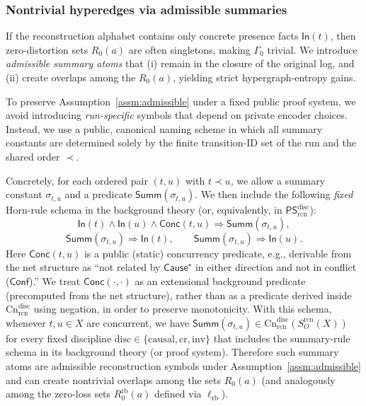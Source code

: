 \documentclass[twoside]{article}
\newcommand{\Cn}{\mathrm{Cn}}
\newcommand{\1}{\mathbf{1}}
\begin{document}
\subsubsection{Nontrivial hyperedges via admissible summaries}
\label{sec:rcn-nontrivial-gamma0}

If the reconstruction alphabet contains only concrete presence facts \(\mathsf{In}(t)\),
then zero-distortion sets \(R_0(a)\) are often singletons, making \(\Gamma_0\) trivial.
We introduce \emph{admissible summary atoms} that (i) remain in the closure of the original log,
and (ii) create overlaps among the \(R_0(a)\), yielding strict hypergraph-entropy gains.


To preserve Assumption~\ref{assm:admissible} under a fixed public proof system, we avoid introducing \emph{run-specific} symbols
that depend on private encoder choices.
Instead, we use a public, canonical naming scheme in which all summary constants are determined solely by the finite
transition-ID set of the run and the shared order \(\prec\).

Concretely, for each ordered pair \((t,u)\) with \(t\prec u\), we allow a summary constant \(\sigma_{t,u}\) and a predicate
\(\mathsf{Summ}(\sigma_{t,u})\).
We then include the following \emph{fixed} Horn-rule schema in the background theory (or, equivalently, in
\(\mathsf{PS}^{\mathrm{disc}}_{\mathrm{rcn}}\)):
\[
\mathsf{In}(t)\wedge \mathsf{In}(u)\wedge \mathsf{Conc}(t,u)\Rightarrow \mathsf{Summ}(\sigma_{t,u}),
\]
\[
\mathsf{Summ}(\sigma_{t,u})\Rightarrow \mathsf{In}(t),
\qquad
\mathsf{Summ}(\sigma_{t,u})\Rightarrow \mathsf{In}(u).
\]
Here \(\mathsf{Conc}(t,u)\) is a public (static) concurrency predicate, e.g., derivable from the net structure as
``not related by \(\mathsf{Cause}^\star\) in either direction and not in conflict (\(\mathsf{Conf}\)).''
We treat \(\mathsf{Conc}(\cdot,\cdot)\) as an extensional background predicate (precomputed from the net structure), rather than as a
predicate derived inside \(\Cn^{\mathrm{disc}}_{\mathrm{rcn}}\) using negation, in order to preserve monotonicity.
With this schema, whenever \(t,u\in X\) are concurrent, we have
\(\mathsf{Summ}(\sigma_{t,u})\in \Cn^{\mathrm{disc}}_{\mathrm{rcn}}(S_O^{\mathrm{rcn}}(X))\)
for every fixed discipline \(\mathrm{disc}\in\{\mathrm{causal},\mathrm{cr},\mathrm{inv}\}\) that includes the summary-rule schema
in its background theory (or proof system).
Therefore such summary atoms are admissible reconstruction symbols under Assumption~\ref{assm:admissible} and can create nontrivial overlaps
among the sets \(R_0(a)\) (and analogously among the zero-loss sets \(R^{\mathrm{rb}}_0(a)\) defined via \(\ell_{\mathrm{rb}}\)).
\end{document}
